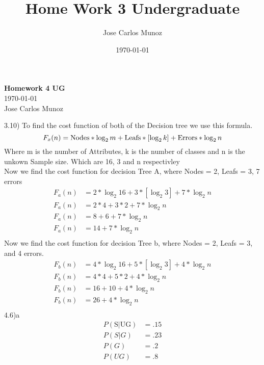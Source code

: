 \documentclass[12pt,english]{article}
\title{Home Work 3 Undergraduate}
\date{\today}
\author{Jose Carlos Munoz}
\begin{document}
\begin{center}
    \Large
    \textbf{Homework 4 UG}\\
    \small
    \today\\
    \large
    Jose Carlos Munoz
\end{center}%
3.10)
To find the cost function of both of the Decision tree we use this formula.
\begin{equation}
F_x(n) = \mbox{Nodes} * \log_{2}m + \mbox{Leafs} * \left [ \log_{2}k \right] + \mbox{Errors} *\log_{2} n\\
\end{equation}
Where m is the number of Attributes, k is the number of classes and n is the unkown Sample size. Which are 16, 3 and n respectivley\\
Now we find the cost function for decision Tree A, where Nodes = 2, Leafs = 3, 7 errors
\begin{equation}\tag{a}\label{eq:a}
\begin{split}
F_a(n) &= 2 * \log_{2}16 + 3 * \left [ \log_{2}3 \right] + 7 *\log_{2} n\\
F_a(n) &= 2 * 4 + 3 * 2 + 7 *\log_{2} n\\
F_a(n) &= 8 + 6 + 7 *\log_{2} n\\
F_a(n) &= 14 + 7 *\log_{2} n\\
\end{split}
\end{equation}
Now we find the cost function for decision Tree b, where Nodes = 2, Leafs = 3, and 4 errors.
\begin{equation}\tag{b}\label{eq:b}
\begin{split}
F_b(n) &= 4 * \log_{2}16 + 5 * \left [ \log_{2}3 \right] + 4 *\log_{2} n\\
F_b(n) &= 4 * 4 + 5 * 2 + 4 *\log_{2} n\\
F_b(n) &= 16 + 10 + 4 *\log_{2} n\\
F_b(n) &= 26 + 4 *\log_{2} n\\
\end{split}
\end{equation}
4.6)a\\
\begin{equation}\tag{1}\label{eq:1}
\begin{split}
P(\mbox{S}\vert \mbox{UG}) &= .15 \\
P(S\vert G) &= .23\\
P(G) &= .2\\
P(UG) &= .8
\end{split}
\end{equation}
\end{document}
